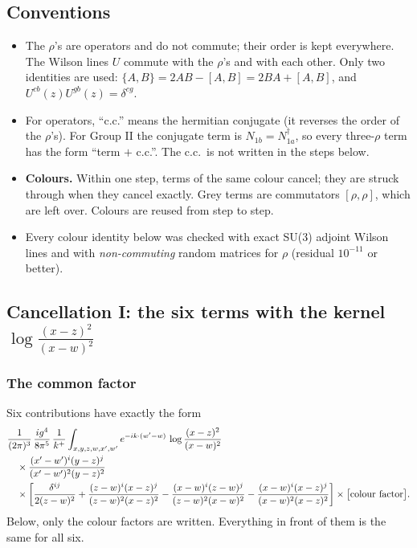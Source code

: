 \documentclass[9pt]{article}
\newcommand{\Gr}[1]{{\color{cX}#1}}
\numberwithin{equation}{section}
\begin{document}
\subsection{Conventions}
\begin{itemize}
\item The $\rho$'s are operators and do not commute; their order is kept everywhere. The Wilson lines $U$ commute with the $\rho$'s and with each other. Only two identities are used: $\{A,B\}=2AB-[A,B]=2BA+[A,B]$, and $U^{cb}(z)U^{gb}(z)=\delta^{cg}$.
\item For operators, ``c.c.'' means the hermitian conjugate (it reverses the order of the $\rho$'s). For Group II the conjugate term is $N_{1b}=N_{1a}^{\dagger}$, so every three-$\rho$ term has the form ``term $+$ c.c.''. The c.c.\ is not written in the steps below.
\item \textbf{Colours.} Within one step, terms of the same colour cancel; they are struck through when they cancel exactly. \Gr{Grey} terms are commutators $[\rho,\rho]$, which are left over. Colours are reused from step to step.
\item Every colour identity below was checked with exact SU(3) adjoint Wilson lines and with \emph{non-commuting} random matrices for $\rho$ (residual $10^{-11}$ or better).
\end{itemize}

\subsection{Cancellation I: the six terms with the kernel $\log\frac{(x-z)^{2}}{(x-w)^{2}}$}
\subsubsection*{The common factor}
Six contributions have exactly the form
\begin{align}
&\frac{1}{(2\pi)^{3}}\,\frac{ig^{4}}{8\pi^{5}}\,\frac{1}{k^{+}}\int_{x,y,z,w,x',w'}e^{-ik\cdot(w'-w)}\,\log\frac{(x-z)^{2}}{(x-w)^{2}}\notag\\&\quad\times\frac{(x'-w')^{i}(y-z)^{j}}{(x'-w')^{2}(y-z)^{2}}\notag\\
&\quad\times\bigg[\frac{\delta^{ij}}{2(z-w)^{2}}+\frac{(z-w)^{i}(x-z)^{j}}{(z-w)^{2}(x-z)^{2}}-\frac{(x-w)^{i}(z-w)^{j}}{(z-w)^{2}(x-w)^{2}}-\frac{(x-w)^{i}(x-z)^{j}}{(x-w)^{2}(x-z)^{2}}\bigg]\times\big[\text{colour factor}\big].\label{eq:common}
\end{align}
Below, only the colour factors are written. Everything in front of them is the same for all six.
\end{document}
